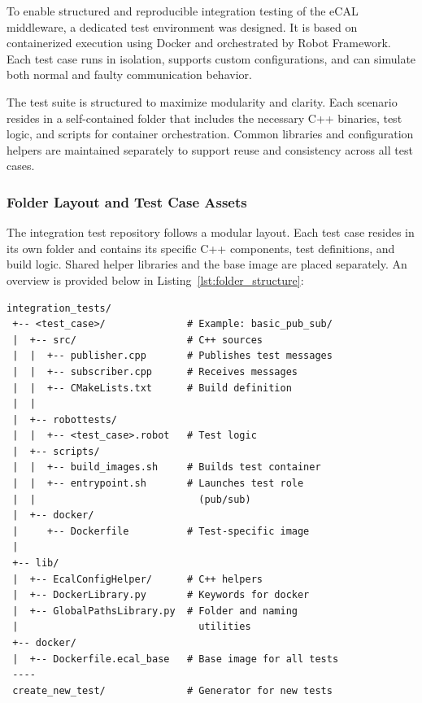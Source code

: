 To enable structured and reproducible integration testing of the eCAL middleware, a dedicated test environment was designed. It is based on containerized execution using Docker and orchestrated by Robot Framework. Each test case runs in isolation, supports custom configurations, and can simulate both normal and faulty communication behavior.

\vspace{1em}
The test suite is structured to maximize modularity and clarity. Each scenario resides in a self-contained folder that includes the necessary C++ binaries, test logic, and scripts for container orchestration. Common libraries and configuration helpers are maintained separately to support reuse and consistency across all test cases.

\subsubsection*{Folder Layout and Test Case Assets}

The integration test repository follows a modular layout. Each test case resides in its own folder and contains its specific C++ components, test definitions, and build logic. Shared helper libraries and the base image are placed separately. An overview is provided below in Listing~\ref{lst:folder_structure}:

\vspace{0.5em}
\begin{lstlisting}[basicstyle=\ttfamily\small, frame=single, caption={Simplified directory structure with key contents}, captionpos=b, label={lst:folder_structure}]
 integration_tests/
 +-- <test_case>/              # Example: basic_pub_sub/
 |  +-- src/                   # C++ sources
 |  |  +-- publisher.cpp       # Publishes test messages
 |  |  +-- subscriber.cpp      # Receives messages
 |  |  +-- CMakeLists.txt      # Build definition
 |  |
 |  +-- robottests/
 |  |  +-- <test_case>.robot   # Test logic
 |  +-- scripts/
 |  |  +-- build_images.sh     # Builds test container
 |  |  +-- entrypoint.sh       # Launches test role 
 |  |                            (pub/sub)
 |  +-- docker/
 |     +-- Dockerfile          # Test-specific image
 |  
 +-- lib/
 |  +-- EcalConfigHelper/      # C++ helpers
 |  +-- DockerLibrary.py       # Keywords for docker
 |  +-- GlobalPathsLibrary.py  # Folder and naming 
 |                               utilities
 +-- docker/
 |  +-- Dockerfile.ecal_base   # Base image for all tests
 ----
 create_new_test/              # Generator for new tests
\end{lstlisting}

